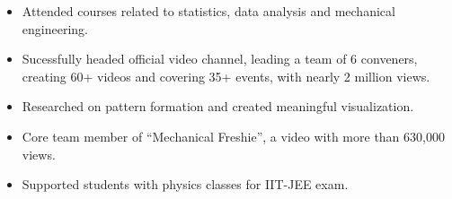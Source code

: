 \documentclass[10pt,a4paper,ragged2e,withhyper]{altacv}
\begin{document}
\begin{paracol}{2}
\begin{itemize}
\item Attended courses related to statistics, data analysis and mechanical engineering.
\item Sucessfully headed official video channel, leading a team of 6 conveners, creating 60+ videos and covering 35+ events, with nearly 2 million views.
\end{itemize}

\begin{itemize}
\item Researched on pattern formation and created meaningful visualization.
\end{itemize}
\label{sec:orgf9f225a}

\begin{itemize}
\item Core team member of ``Mechanical Freshie'', a video with more than 630,000 views.
\item Supported students with physics classes for IIT-JEE exam.
\end{itemize}
\end{paracol}
\end{document}
